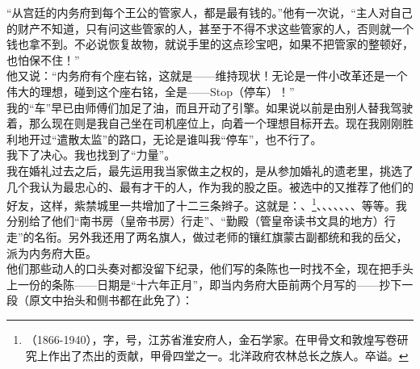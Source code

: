 “从宫廷的内务府到每个王公的管家人，都是最有钱的。”他有一次说，“主人对自己的财产不知道，只有问这些管家的人，甚至于不得不求这些管家的人，否则就一个钱也拿不到。不必说恢复故物，就说手里的这点珍宝吧，如果不把管家的整顿好，也怕保不住！”\\

他又说：“内务府有个座右铭，这就是——维持现状！无论是一件小改革还是一个伟大的理想，碰到这个座右铭，全是——Stop（停车）！”\\

我的“车”早已由师傅们加足了油，而且开动了引擎。如果说以前是由别人替我驾驶着，那么现在则是我自己坐在司机座位上，向着一个理想目标开去。现在我刚刚胜利地开过“遣散太监”的路口，无论是谁叫我“停车”，也不行了。\\

我下了决心。我也找到了“力量”。\\

我在婚礼过去之后，最先运用我当家做主之权的，是从参加婚礼的遗老里，挑选了几个我认为最忠心的、最有才干的人，作为我的股之臣。被选中的又推荐了他们的好友，这样，紫禁城里一共增加了十二三条辫子。这就是：、\footnote{（1866-1940），字，号，江苏省淮安府人，金石学家。在甲骨文和敦煌写卷研究上作出了杰出的贡献，甲骨四堂之一。北洋政府农林总长之族人。卒谥。}、、、、、、、等等。我分别给了他们“南书房（皇帝书房）行走”、“勤殿（管皇帝读书文具的地方）行走”的名衔。另外我还用了两名旗人，做过老师的镶红旗蒙古副都统和我的岳父，派为内务府大臣。\\

他们那些动人的口头奏对都没留下纪录，他们写的条陈也一时找不全，现在把手头上一份的条陈——日期是“十六年正月”，即当内务府大臣前两个月写的——抄下一段（原文中抬头和侧书都在此免了）：\\

